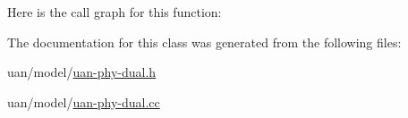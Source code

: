 Here is the call graph for this function\+:




The documentation for this class was generated from the following files\+:\begin{DoxyCompactItemize}
\item 
uan/model/\hyperlink{uan-phy-dual_8h}{uan-\/phy-\/dual.\+h}\item 
uan/model/\hyperlink{uan-phy-dual_8cc}{uan-\/phy-\/dual.\+cc}\end{DoxyCompactItemize}
